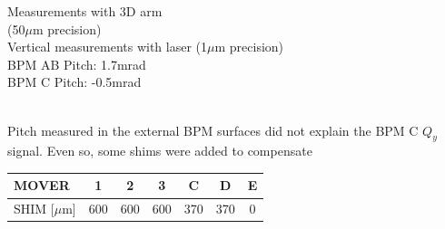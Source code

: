 \documentclass[a4paper,11pt]{book}
\begin{document}
\begin{minipage}{0.5\textwidth}
Measurements with 3D arm\\
\hspace*{0.5cm}(50$\mu$m precision)\\
Vertical measurements with laser
\hspace*{0.5cm}(1$\mu$m precision)\\
BPM AB Pitch: 1.7mrad\\
BPM C Pitch: -0.5mrad
\end{minipage}\\\vspace*{-1.2cm}
Pitch measured in the external BPM surfaces did not explain the BPM C $Q_y$ signal. Even so, some shims were added to compensate
\begin{center}
\begin{tabular}{|l|c|c|c|c|c|c|}\hline
 MOVER & 1&2&3&C&D&E\\\hline
 SHIM [$\mu$m]& 600&600&600&370&370&0\\\hline
\end{tabular}
\end{center}
\end{document}
